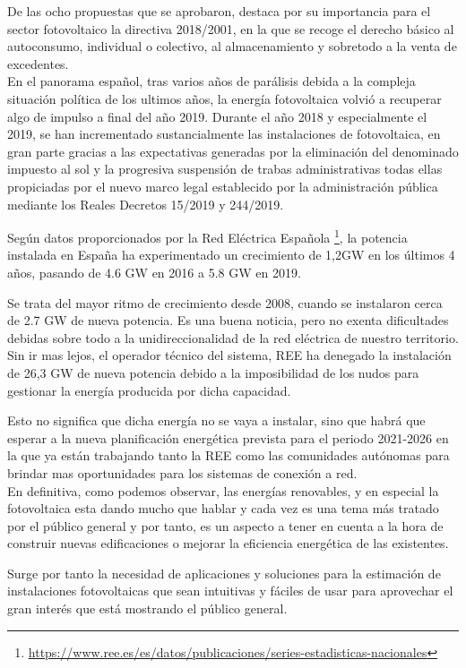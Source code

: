 De las ocho propuestas que se aprobaron, destaca por su importancia para el sector fotovoltaico la directiva 2018/2001, en la que se recoge el derecho básico al autoconsumo, individual o colectivo, al almacenamiento y sobretodo a la venta de excedentes.\\

En el panorama español, tras varios años de parálisis debida a la compleja situación política de los ultimos años, la energía fotovoltaica volvió a recuperar algo de impulso a final del año 2019. Durante el año 2018 y especialmente el 2019, se han incrementado sustancialmente las instalaciones de fotovoltaica, en gran parte gracias a las expectativas generadas por la eliminación del denominado impuesto al sol y la progresiva suspensión de trabas administrativas todas ellas propiciadas por el nuevo marco legal establecido por la administración pública mediante los Reales Decretos 15/2019 y 244/2019.

Según datos proporcionados por la Red Eléctrica Española \footnote{\url{https://www.ree.es/es/datos/publicaciones/series-estadisticas-nacionales}}, la potencia instalada en España ha experimentado un crecimiento de 1,2GW en los últimos 4 años, pasando de 4.6 GW en 2016 a 5.8 GW en 2019.

Se trata del mayor ritmo de crecimiento desde 2008, cuando se instalaron cerca de 2.7 GW de nueva potencia. Es una buena noticia, pero no exenta dificultades debidas sobre todo a la unidireccionalidad de la red eléctrica de nuestro territorio. Sin ir mas lejos, el operador técnico del sistema, REE ha denegado la instalación de 26,3 GW de nueva potencia debido a la imposibilidad de los nudos para gestionar la energía producida por dicha capacidad.

Esto no significa que dicha energía no se vaya a instalar, sino que habrá que esperar a la nueva planificación energética prevista para el periodo 2021-2026 en la que ya están trabajando tanto la REE como las comunidades autónomas para brindar mas oportunidades para los sistemas de conexión a red.\\

En definitiva, como podemos observar, las energías renovables, y en especial la fotovoltaica esta dando mucho que hablar y cada vez es una tema más tratado por el público general y por tanto, es un aspecto a tener en cuenta a la hora de construir nuevas edificaciones o mejorar la eficiencia energética de las existentes.

Surge por tanto la necesidad de aplicaciones y soluciones para la estimación de instalaciones fotovoltaicas que sean intuitivas y fáciles de usar para aprovechar el gran interés que está mostrando el público general.

